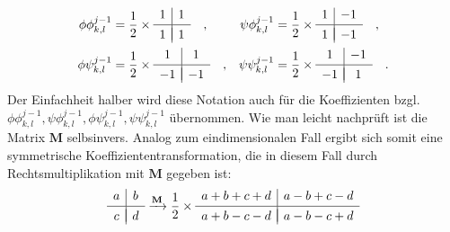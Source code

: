 \begin{align*}
\phi\phi_{k,l}^{j-1} &=
\frac{1}{2} \times
\begin{array}{c|c}
1 & 1 \\[.05cm] 
\hline \\[-0.35cm]
1 & 1
\end{array}
\quad , &
\psi\phi_{k,l}^{j-1} &=
\frac{1}{2} \times
\begin{array}{c|c}
1 & -1 \\[.05cm] 
\hline \\[-0.35cm]
1 & -1
\end{array}
\quad , \\
\phi\psi_{k,l}^{j-1} &=
\frac{1}{2} \times
\begin{array}{c|c}
1 & 1 \\[.05cm] 
\hline \\[-0.35cm]
-1 & -1
\end{array}
\quad , &
\psi\psi_{k,l}^{j-1} &=
\frac{1}{2} \times
\begin{array}{c|c}
1 & -1 \\[.05cm] 
\hline \\[-0.35cm]
-1 & 1
\end{array}
\quad .
\end{align*}
%
Der Einfachheit halber wird diese Notation auch für die Koeffizienten bzgl. $\phi\phi_{k,l}^{j-1}, \psi\phi_{k,l}^{j-1}, \phi\psi_{k,l}^{j-1}, \psi\psi_{k,l}^{j-1}$ übernommen.
%
Wie man leicht nachprüft ist die Matrix $\mathbf{M}$ selbsinvers. Analog zum eindimensionalen Fall ergibt sich somit eine symmetrische Koeffiziententransformation, die in diesem Fall durch Rechtsmultiplikation mit $\mathbf{M}$ gegeben ist:
%
\[
\begin{array}{c|c}
a & b \\[.05cm] 
\hline \\[-0.35cm]
c & d
\end{array}
\xrightarrow[]{\mathbf{M}}
\frac{1}{2} \times
\begin{array}{c|c}
a+b+c+d & a-b+c-d \\[.05cm] 
\hline \\[-0.35cm]
a+b-c-d & a-b-c+d
\end{array}
\]
%
%
